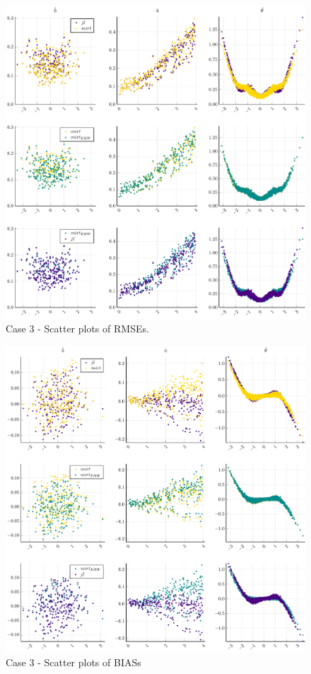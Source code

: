\begin{figure}[ht]
	\centering
	\includegraphics[width=\textwidth]{Figures/3/RMSEscatter.pdf}
	\caption{Case 3 - Scatter plots of RMSEs.}
	\label{fig:spRMSE3}
\end{figure}
\begin{figure}[ht]
	\centering
	\includegraphics[width=\textwidth]{Figures/3/BIASscatter.pdf}
	\caption{Case 3 - Scatter plots of BIASs }
	\label{fig:spBIAS3}
\end{figure}
